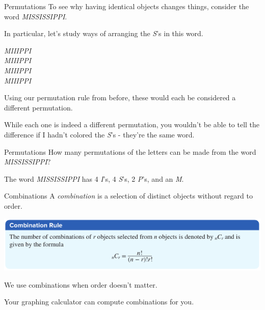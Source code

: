 \documentclass[t, aspectratio=169]{beamer}
\newcommand{\red}[1]{{\color{red}{#1}}} %
\newcommand{\orange}[1]{{\color{orange}{#1}}} %
\newcommand{\violet}[1]{{\color{violet}{#1}}} %
\newcommand{\blue}[1]{{\color{blue}{#1}}} %
\newcommand{\?}{\stackrel{?}{=}}
\begin{document}
	\begin{frame}{Permutations}
		To see why having identical objects changes things, consider the word \textit{MISSISSIPPI}. \pause
		
		In particular, let's study ways of arranging the \textit{S}'s in this word. \pause
		
		\textit{MI\red{S}\blue{S}I\orange{S}\violet{S}IPPI} \\
		\textit{MI\violet{S}\orange{S}I\blue{S}\red{S}IPPI} \\
		\textit{MI\blue{S}\violet{S}I\red{S}\orange{S}IPPI} \\
		\textit{MI\orange{S}\blue{S}I\violet{S}\red{S}IPPI} \pause
		
		Using our permutation rule from before, these would each be considered a different permutation. \pause
		
		While each one is indeed a different permutation, you wouldn't be able to tell the difference if I hadn't colored the \textit{S}'s - they're the same word.
	\end{frame}

	\begin{frame}{Permutations}
		How many permutations of the letters can be made from the word \textit{MISSISSIPPI}?
		
		The word \textit{MISSISSIPPI} has 4 \textit{I}'s, 4 \textit{S}'s, 2 \textit{P}'s, and an \textit{M}.
		\begin{flalign*}
		\end{flalign*}
	\end{frame}

	\begin{frame}{Combinations}
		A \textit{combination} is a selection of distinct objects without regard to order. \pause
		
		\includegraphics[width=\textwidth]{combination.png} \pause
		
		We use combinations when order doesn't matter. \pause
		
		Your graphing calculator can compute combinations for you.
	\end{frame}
\end{document}
